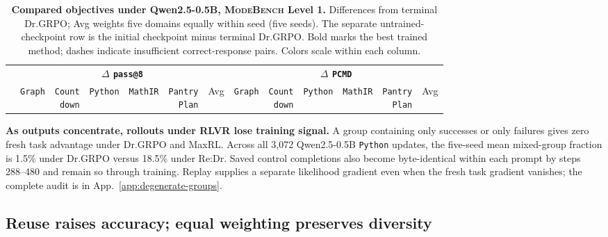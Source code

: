 \documentclass{article}
\newcommand{\1}{\mathbf 1}
\newcommand{\mb}{\textsc{ModeBench}}
\newcommand{\pmd}{\texttt{PCMD}}
\theoremstyle{remark}
\theoremstyle{definition}
\theoremstyle{plain}
\begin{document}
\begin{table}[!b]
  \centering
  \caption{\textbf{Compared objectives under Qwen2.5-0.5B, \mb{} Level 1.} Differences from terminal Dr.GRPO; Avg weights five domains equally within seed (five seeds). The separate untrained-checkpoint row is the initial checkpoint minus terminal Dr.GRPO. Bold marks the best trained method; dashes indicate insufficient correct-response pairs. Colors scale within each column.}
  \label{tab:direct-comparator-matrix}
  \scriptsize
  \setlength{\tabcolsep}{1.4pt}
  \renewcommand{\arraystretch}{0.95}
  \begin{tabular}{@{}l*{12}{r}@{}}
    \toprule
    & \multicolumn{6}{c}{\textbf{$\Delta$ \texttt{pass@8}}}
      & \multicolumn{6}{c}{\textbf{$\Delta$ \pmd{}}} \\
    \cmidrule(lr){2-7}\cmidrule(l){8-13}
    & \texttt{Graph}
    & \shortstack{\texttt{Count}\\\texttt{down}}
    & \texttt{Python}
    & \texttt{MathIR}
    & \shortstack{\texttt{Pantry}\\\texttt{Plan}}
    & Avg
    & \texttt{Graph}
    & \shortstack{\texttt{Count}\\\texttt{down}}
    & \texttt{Python}
    & \texttt{MathIR}
    & \shortstack{\texttt{Pantry}\\\texttt{Plan}}
    & Avg \\
    \midrule
    
  \end{tabular}
\end{table}


\textbf{As outputs concentrate, rollouts under RLVR lose training signal.}
A group containing only successes or only failures gives zero fresh task advantage under Dr.GRPO and MaxRL. Across all 3,072 Qwen2.5-0.5B \texttt{Python} updates, the five-seed mean mixed-group fraction is 1.5\% under Dr.GRPO versus 18.5\% under Re:Dr. Saved control completions also become byte-identical within each prompt by steps 288--480 and remain so through training. Replay supplies a separate likelihood gradient even when the fresh task gradient vanishes; the complete audit is in App.~\ref{app:degenerate-groups}.

\subsection{Reuse raises accuracy; equal weighting preserves diversity}
\label{sec:results-retention}
\end{document}
